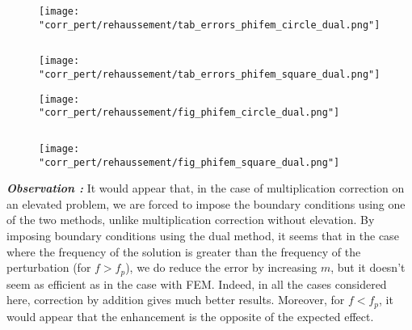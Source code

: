 \begin{minipage}{0.48\linewidth}
	\begin{figure}[H]
		\centering
		\texttt{[image: "corr\_pert/rehaussement/tab\_errors\_phifem\_circle\_dual.png"]}
		\label{corr_pert_phifem_circle_dual_reh}
	\end{figure} 
\end{minipage} $\qquad$
\begin{minipage}{0.48\linewidth}
	\begin{figure}[H]
		\centering
		\texttt{[image: "corr\_pert/rehaussement/tab\_errors\_phifem\_square\_dual.png"]}
		\label{corr_pert_phifem_square_dual_reh}
	\end{figure} 
\end{minipage}

\begin{minipage}{0.48\linewidth}
	\begin{figure}[H]
		\centering
		\texttt{[image: "corr\_pert/rehaussement/fig\_phifem\_circle\_dual.png"]}
		\label{corr_pert_phifem_circle_dual_reh_fig}
	\end{figure} 
\end{minipage} $\qquad$
\begin{minipage}{0.48\linewidth}
	\begin{figure}[H]
		\centering
		\texttt{[image: "corr\_pert/rehaussement/fig\_phifem\_square\_dual.png"]}
		\label{corr_pert_phifem_square_dual_reh_fig}
	\end{figure} 
\end{minipage}

\textbf{\textit{Observation :}} It would appear that, in the case of multiplication correction on an elevated problem, we are forced to impose the boundary conditions using one of the two methods, unlike multiplication correction without elevation. By imposing boundary conditions using the dual method, it seems that in the case where the frequency of the solution is greater than the frequency of the perturbation (for $f>f_p$), we do reduce the error by increasing $m$, but it doesn't seem as efficient as in the case with FEM. Indeed, in all the cases considered here, correction by addition gives much better results. Moreover, for $f< f_p$, it would appear that the enhancement is the opposite of the expected effect.

